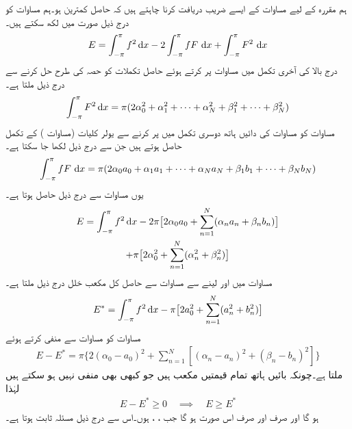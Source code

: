 ہم مقررہ  کے لیے مساوات  کے ایسے  ضریب  دریافت کرنا چاہتے ہیں کہ حاصل  کمترین ہو۔ہم مساوات  کو درج ذیل صورت میں لکھ سکتے ہیں۔
\begin{align}\label{مساوات_فوریئر_تقریب_ت}
E=\int_{-\pi}^{\pi} f^2\dif x-2\int_{-\pi}^{\pi} fF\,\dif x+\int_{-\pi}^{\pi} F^2\,\dif x
\end{align}
درج بالا کی آخری تکمل میں مساوات  پر کرتے ہوئے حاصل تکملات کو حصہ  کی طرح حل کرنے سے درج ذیل ملتا ہے۔ 
\begin{align*}
\int_{-\pi}^{\pi} F^2\dif x=\pi(2\alpha_0^2+\alpha_1^2+\cdots+\alpha_N^2+\beta_1^2+\cdots+\beta_N^2)
\end{align*}
مساوات  کو  مساوات  کی دائیں ہاتھ دوسری تکمل میں پر کرنے سے   یولر کلیات (مساوات ) کے تکمل حاصل ہوتے ہیں جن سے درج ذیل لکھا جا سکتا ہے۔
\begin{align*}
\int_{-\pi}^{\pi} fF\,\dif x=\pi(2\alpha_0a_0+\alpha_1a_1+\cdots+\alpha_Na_N+\beta_1b_1+\cdots+\beta_Nb_N)
\end{align*}
یوں مساوات  سے درج ذیل حاصل ہوتا ہے۔
\begin{multline}\label{مساوات_فوریئر_تقریب_ٹ}
E=\int_{-\pi}^{\pi} f^2\dif x-2\pi\big[2\alpha_0a_0+\sum\limits_{n=1}^{N}(\alpha_na_n+\beta_nb_n)\big]\\
+\pi\big[2\alpha_0^2+\sum\limits_{n=1}^{N}(\alpha_n^2+\beta_n^2)\big]
\end{multline}
مساوات  میں  اور  لینے سے  مساوات  سے حاصل کل مکعب خلل درج ذیل ملتا ہے۔
\begin{align}\label{مساوات_فوریئر_تقریب_ث}
E^*=\int_{-\pi}^{\pi} f^2\dif x-\pi\big[2a_0^2+\sum\limits_{n=1}^{N}(a_n^2+b_n^2)\big]
\end{align}
مساوات  کو مساوات  سے منفی کرتے ہوئے
\begin{align*}
E-E^*=\pi\big\{2(\alpha_0-a_0)^2+\sum\limits_{n=1}^{N}[(\alpha_n-a_n)^2+(\beta_n-b_n)^2]\big\}
\end{align*}
ملتا ہے۔چونکہ بائیں ہاتھ تمام قیمتیں مکعب ہیں جو کبھی بھی منفی نہیں ہو سکتے ہیں لہٰذا 
\begin{align*}
E-E^*\ge 0\quad \implies \quad E\ge E^*
\end{align*}
ہو گا اور  صرف اور صرف اس صورت ہو گا جب ، ،  ہوں۔اس سے درج ذیل مسئلہ ثابت ہوتا ہے۔

